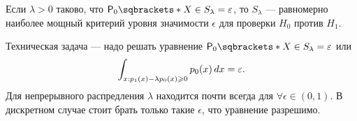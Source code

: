 \begin{consequence}
    Если \(\lambda > 0\) таково, что \(\PP[0]{X \in S_\lambda} = \epsilon\), то \(S_\lambda\) --- равномерно наиболее мощный критерий уровня значимости \(\epsilon\) для проверки \(H_0\) против \(H_1\).
\end{consequence}

Техническая задача --- надо решать уравнение \(\PP[0]{X \in S_\lambda} = \epsilon\) или
\begin{displaymath}
    \int_{x: p_1(x) - \lambda p_0(x) \geqslant 0} p_0(x) \mathop{}\!d x = \varepsilon.
\end{displaymath}
Для непрерывного распредления \(\lambda\) находится почти всегда для \(\forall \epsilon \in (0, 1)\). В дискретном случае стоит брать только такие \(\epsilon\), что уравнение разрешимо.

